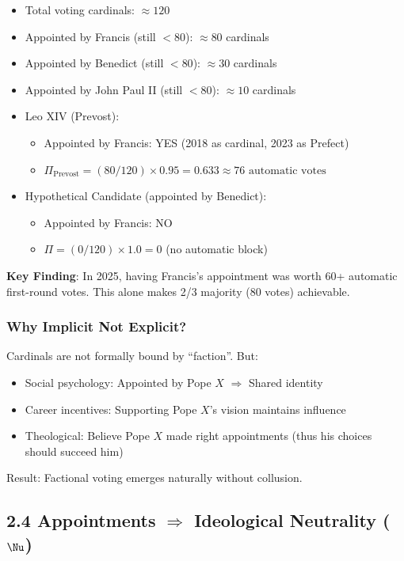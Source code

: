 \documentclass[11pt]{article}
\begin{document}
\begin{itemize}
\item Total voting cardinals: $\approx 120$
\item Appointed by Francis (still $<80$): $\approx 80$ cardinals
\item Appointed by Benedict (still $<80$): $\approx 30$ cardinals
\item Appointed by John Paul II (still $<80$): $\approx 10$ cardinals

\item Leo XIV (Prevost):
	\begin{itemize}
	\item Appointed by Francis: YES (2018 as cardinal, 2023 as Prefect)
	\item $\Pi_{\text{Prevost}} = (80 / 120) \times 0.95 = 0.633 \approx 76 \text{ automatic votes}$
	\end{itemize}

\item Hypothetical Candidate (appointed by Benedict):
	\begin{itemize}
	\item Appointed by Francis: NO
	\item $\Pi = (0 / 120) \times 1.0 = 0$ (no automatic block)
	\end{itemize}
\end{itemize}

\textbf{Key Finding}: In 2025, having Francis's appointment was worth 60+ automatic first-round votes. This alone makes 2/3 majority (80 votes) achievable.

\subsubsection{Why Implicit Not Explicit?}

Cardinals are not formally bound by ``faction''. But:
\begin{itemize}
\item Social psychology: Appointed by Pope $X$ $\Rightarrow$ Shared identity
\item Career incentives: Supporting Pope $X$'s vision maintains influence
\item Theological: Believe Pope $X$ made right appointments (thus his choices should succeed him)
\end{itemize}

Result: Factional voting emerges naturally without collusion.

\subsection{2.4 Appointments $\Rightarrow$ Ideological Neutrality ($\Nu$)}
\end{document}
